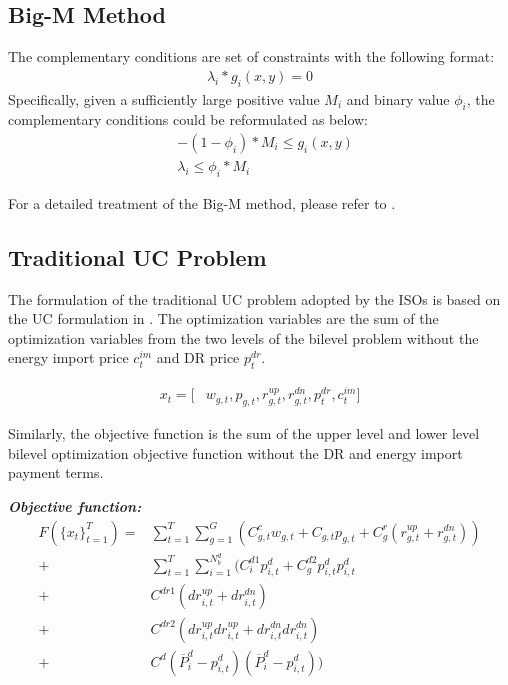\subsection{Big-M Method}
The complementary conditions are set of constraints with the following format:\\
\begin{align}
\lambda_i*g_i(x,y) =0 \nonumber
\end{align}
Specifically, given a sufficiently large positive value $M_i$ and binary value $\phi_i$, the complementary conditions could be reformulated as below:
\begin{align}
&-(1-\phi_i)*M_i\leq g_i(x,y)\nonumber\\
&\lambda_i\leq\phi_i*M_i\nonumber
\end{align}

For a detailed treatment of the Big-M method, please refer to \cite{winston2003introduction}.

\subsection{Traditional UC Problem}
The formulation of the traditional UC problem adopted by the ISOs is based on the UC formulation in \cite{papavasiliou2013multiarea}. The optimization variables are the sum of the optimization variables from the two levels of the bilevel problem without the energy import price $c^{im}_t$ and DR price $p^{dr}_t$. 

\begin{align*}
x_t=[&w_{g,t}, p_{g,t}, r_{g,t}^{up}, r_{g,t}^{dn}, p^{dr}_{t}, c^{im}_{t}]
\end{align*}

Similarly, the objective function is the sum of the upper level and lower level bilevel optimization objective function without the DR and energy import payment terms.

\textbf{\emph{Objective function:}}
\begin{align*}
F(\{x_t\}^{T}_{t=1}) =& \sum_{t=1}^{T}\sum_{g=1}^{G}(C^c_{g,t} w_{g,t}+C_{g,t} p_{g,t}+C^r_{g}(r_{g,t}^{up}+r_{g,t}^{dn}))\\
+ &\sum_{t=1}^{T}\sum_{i=1}^{N^d_b}(C^{d1}_i p^d_{i,t} +C^{d2}_g p^d_{i,t}  p^d_{i,t} \\
+ &C^{dr1} (dr^{up}_{i,t} + dr^{dn}_{i,t} ) \\
+ &C^{dr2} (dr^{up}_{i,t}dr^{up}_{i,t} + dr^{dn}_{i,t}dr^{dn}_{i,t}  ) \\
+ &C^{d}(\overline{P}^d_{i}-p^d_{i,t})(\overline{P}^d_{i}-p^d_{i,t}))
\end{align*}

